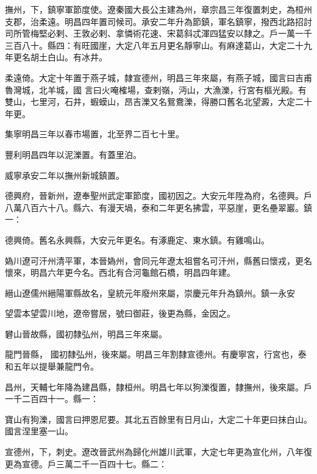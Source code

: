 \begin{pinyinscope}
 撫州，下，鎮寧軍節度使。遼秦國大長公主建為州，章宗昌三年復置刺史，為桓州支郡，治柔遠。明昌四年置司候司。承安二年升為節鎮，軍名鎮寧，撥西北路招討司所管梅堅必剌、王敦必剌、拿憐術花速、宋葛斜忒渾四猛安以隸之。戶一萬一千三百八十。縣四：有旺國崖，大定八年五月更名靜寧山。有麻達葛山，大定二十九年更名胡土白山。有冰井。



 柔遠倚。大定十年置于燕子城，隸宣德州，明昌三年來屬，有燕子城，國言曰吉甫魯灣城，北羊城，國
 言曰火唵榷場，查剌嶺，沔山，大漁濼，行宮有樞光殿。有雙山，七里河，石井，蝦蟆山，昂吉濼又名鴛鴦濼，得勝口舊名北望澱，大定二十年更。



 集寧明昌三年以春市場置，北至界二百七十里。



 豐利明昌四年以泥濼置。有蓋里泊。



 威寧承安二年以撫州新城鎮置。



 德興府，晉新州，遼奉聖州武定軍節度，國初因之。大安元年陞為府，名德興。戶八萬八百六十八。縣六、有漫天堝，泰和二年更名拂雲，平惡崖，更名壘翠巖。鎮一：



 德興倚。舊名永興縣，大安元年更名。有涿鹿定、東水鎮。有雞鳴山。



 媯川遼可汗州清平軍，本晉媯州，會同元年遼太祖嘗名可汗州，縣舊曰懷戎，更名懷來，明昌六年更今名。西北有合河龜館石橋，明昌四年建。



 縉山遼儒州縉陽軍縣故名，皇統元年廢州來屬，崇慶元年升為鎮州。鎮一永安



 望雲本望雲川地，遼帝嘗居，號曰御莊，後更為縣，金因之。



 礬山晉故縣，國初隸弘州，明昌三年來屬。



 龍門晉縣，
 國初隸弘州，後來屬。明昌三年割隸宣德州。有慶寧宮，行宮也，泰和五年以提舉兼龍門令。



 昌州，天輔七年降為建昌縣，隸桓州。明昌七年以狗濼復置，隸撫州，後來屬。戶一千二百四十一。縣一：



 寶山有狗濼，國言曰押恩尼要。其北五百餘里有日月山，大定二十年更曰抹白山。國言涅里塞一山。



 宣德州，下，刺史。遼改晉武州為歸化州雄川武軍，大定七年更為宣化州，八年復更為宣德。戶三萬二千一百四十七。縣二：




\end{pinyinscope}
